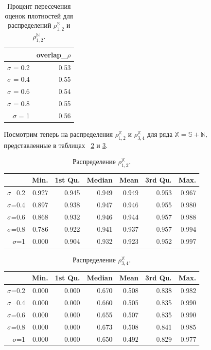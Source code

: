 \documentclass[specialist,
               substylefile = spbu.rtx,
               subf,href,colorlinks=true, 12pt]{disser}
\begin{document}
{{\begin{table}[hhh!]
\caption{Процент пересечения оценок плотностей для распределений $\rho^{\mathbb{S}}_{1,2}$ и $\rho^{\mathbb{N}}_{1,2}$.}
\centering
\begin{tabular}{rr}
  \hline
 & overlap\_$\rho$ \\ 
  \hline
$\sigma$ = 0.2 & 0.53 \\ 
  $\sigma$ = 0.4 & 0.55 \\ 
  $\sigma$ = 0.6 & 0.54 \\ 
  $\sigma$ = 0.8 & 0.55 \\ 
  $\sigma$ = 1 & 0.56 \\ 
   \hline
\end{tabular}
\label{tab:model_dist_pgram_overlap_222}
\end{table}

Посмотрим теперь на распределения  $\rho^{\mathbb{X}}_{1,2}$ и  $\rho^{\mathbb{X}}_{3,4}$ для ряда $\mathbb{X} = \mathbb{S} + \mathbb{N}$, представленные в таблицах ~\ref{tab:model_dist_pgram_sig_noise2} и \ref{tab:model_dist_pgram_sig_noise22}.

\begin{table}[hhh!]
\caption{Распределение $\rho^{\mathbb{X}}_{1,2}$.}
\centering
\begin{tabular}{rrrrrrr}
  \hline
 & Min. & 1st Qu. & Median & Mean & 3rd Qu. & Max. \\ 
  \hline
$\sigma$=0.2 & 0.927 & 0.945 & 0.949 & 0.949 & 0.953 & 0.967 \\ 
  $\sigma$=0.4 & 0.897 & 0.938 & 0.947 & 0.946 & 0.955 & 0.980 \\ 
  $\sigma$=0.6 & 0.868 & 0.932 & 0.946 & 0.944 & 0.957 & 0.988 \\ 
  $\sigma$=0.8 & 0.786 & 0.922 & 0.941 & 0.937 & 0.957 & 0.994 \\ 
  $\sigma$=1 & 0.000 & 0.904 & 0.932 & 0.923 & 0.952 & 0.997 \\ 
   \hline
\end{tabular}
\label{tab:model_dist_pgram_sig_noise2}
\end{table}

\begin{table}[hhh!]
\caption{Распределение $\rho^{\mathbb{X}}_{3,4}$.}
\centering
\begin{tabular}{rrrrrrr}
  \hline
 & Min. & 1st Qu. & Median & Mean & 3rd Qu. & Max. \\ 
  \hline
$\sigma$=0.2 & 0.000 & 0.000 & 0.670 & 0.508 & 0.838 & 0.982 \\ 
  $\sigma$=0.4 & 0.000 & 0.000 & 0.660 & 0.505 & 0.835 & 0.990 \\ 
  $\sigma$=0.6 & 0.000 & 0.000 & 0.655 & 0.507 & 0.835 & 0.990 \\ 
  $\sigma$=0.8 & 0.000 & 0.000 & 0.673 & 0.508 & 0.841 & 0.985 \\ 
  $\sigma$=1 & 0.000 & 0.000 & 0.650 & 0.492 & 0.829 & 0.977 \\ 
   \hline
\end{tabular}
\label{tab:model_dist_pgram_sig_noise22}
\end{table}

}}
\end{document}
